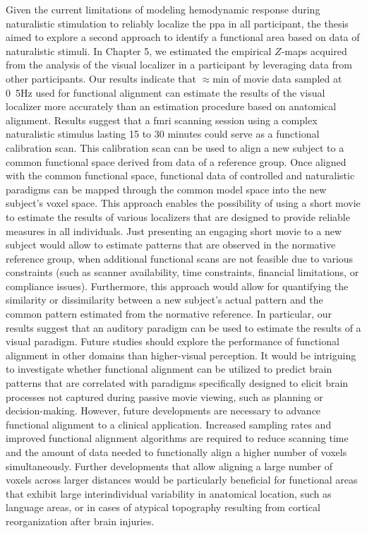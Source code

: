 
%
Given the current limitations of modeling hemodynamic response during
naturalistic stimulation to reliably localize the \ac{ppa} in all participant,
the thesis aimed to explore a second approach to identify a functional area
based on data of naturalistic stimuli.
%
In Chapter 5, we estimated the empirical $Z$-maps acquired from the analysis of
the visual localizer in a participant by leveraging data from other
participants.
%
Our results indicate that $\approx$\unit[15]{min} of movie data sampled at
\unit{0.5}{Hz} used for functional alignment can estimate the results of the
visual localizer more accurately than an estimation procedure based on
anatomical alignment.
%
Results suggest that a \ac{fmri} scanning session using a complex naturalistic
stimulus lasting 15 to 30 minutes could serve as a functional calibration scan.
%
This calibration scan can be used to align a new subject to a common functional
space derived from data of a reference group.
%
Once aligned with the common functional space, functional data of controlled and
naturalistic paradigms can be mapped through the common model space into the new
subject's voxel space.
%
This approach enables the possibility of using a short movie to estimate the
results of various localizers that are designed to provide reliable measures in
all individuals.
%
Just presenting an engaging short movie to a new subject would allow to estimate
patterns that are observed in the normative reference group, when additional
functional scans are not feasible due to various constraints (such as scanner
availability, time constraints, financial limitations, or compliance issues).
%
Furthermore, this approach would allow for quantifying the similarity or
dissimilarity between a new subject's actual pattern and the common pattern
estimated from the normative reference.
%
In particular, our results suggest that an auditory paradigm can be used to
estimate the results of a visual paradigm.
%
Future studies should explore the performance of functional alignment in other
domains than higher-visual perception.
%
It would be intriguing to investigate whether functional alignment can be
utilized to predict brain patterns that are correlated with paradigms
specifically designed to elicit brain processes not captured during passive
movie viewing, such as planning or decision-making.
%
However, future developments are necessary to advance functional alignment to a
clinical application.
%
Increased sampling rates and improved functional alignment algorithms are
required to reduce scanning time and the amount of data needed to functionally
align a higher number of voxels simultaneously.
%
Further developments that allow aligning a large number of voxels across larger
distances would be particularly beneficial for functional areas that exhibit
large interindividual variability in anatomical location, such as language
areas, or in cases of atypical topography resulting from cortical reorganization
after brain injuries.



